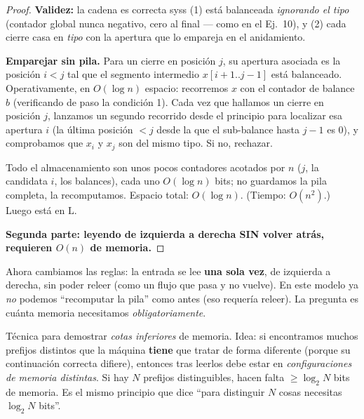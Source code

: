 \documentclass[11pt,a4paper]{article}
\theoremstyle{plain}
\theoremstyle{definition}
\newcommand{\Lclass}{\mathrm{L}}
\begin{document}
\begin{proof}
\textbf{Validez:} la cadena es correcta syss (1) est\'a balanceada \emph{ignorando el
tipo} (contador global nunca negativo, cero al final --- como en el Ej.\ 10), y (2)
cada cierre casa en \emph{tipo} con la apertura que lo empareja en el anidamiento.

\textbf{Emparejar sin pila.} Para un cierre en posici\'on $j$, su apertura asociada es
la posici\'on $i<j$ tal que el segmento intermedio $x[i+1..j-1]$ est\'a balanceado.
Operativamente, en $O(\log n)$ espacio: recorremos $x$ con el contador de balance $b$
(verificando de paso la condici\'on 1). Cada vez que hallamos un cierre en posici\'on
$j$, lanzamos un segundo recorrido desde el principio para localizar esa apertura
$i$ (la \'ultima posici\'on $<j$ desde la que el sub-balance hasta $j-1$ es $0$), y
comprobamos que $x_i$ y $x_j$ son del mismo tipo. Si no, rechazar.

Todo el almacenamiento son unos pocos contadores acotados por $n$ ($j$, la candidata
$i$, los balances), cada uno $O(\log n)$ bits; no guardamos la pila completa, la
recomputamos. Espacio total: $O(\log n)$. (Tiempo: $O(n^2)$.) Luego est\'a en
$\Lclass$.

\medskip
\textbf{Segunda parte: leyendo de izquierda a derecha SIN volver atr\'as, requieren
$O(n)$ de memoria.}
\end{proof}

\begin{concepto}
Ahora cambiamos las reglas: la entrada se lee \textbf{una sola vez}, de izquierda a
derecha, sin poder releer (como un flujo que pasa y no vuelve). En este modelo ya
\emph{no} podemos ``recomputar la pila'' como antes (eso requer\'ia releer). La
pregunta es cu\'anta memoria necesitamos \emph{obligatoriamente}.
\end{concepto}

\begin{concepto}
T\'ecnica para demostrar \emph{cotas inferiores} de memoria. Idea: si encontramos
muchos prefijos distintos que la m\'aquina \textbf{tiene} que tratar de forma
diferente (porque su continuaci\'on correcta difiere), entonces tras leerlos debe
estar en \emph{configuraciones de memoria distintas}. Si hay $N$ prefijos
distinguibles, hacen falta $\ge \log_2 N$ bits de memoria. Es el mismo principio que
dice ``para distinguir $N$ cosas necesitas $\log_2 N$ bits''.
\end{concepto}
\end{document}
